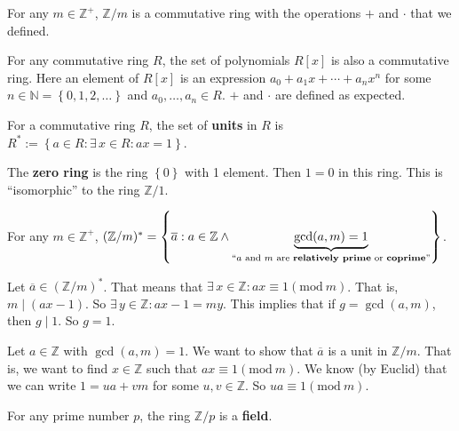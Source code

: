 \documentclass{notes}
\begin{document}
\begin{eg}
  For any $m \in \mathbb Z^+$, $\mathbb Z / m$ is a commutative ring with the operations $+$ and $\cdot$ that we defined.
\end{eg}

\begin{eg}
  For any commutative ring $R$, the set of polynomials $R[x]$ is also a commutative ring.
  Here an element of $R[x]$ is an expression $a_0 + a_1 x + \cdots + a_n x^n$ for some $n \in \mathbb N = \left \{ 0, 1, 2, \dots \right \}$ and $a_0, \dots, a_n \in R$.
  $+$ and $\cdot$ are defined as expected.
\end{eg}

\begin{defn}
  For a commutative ring $R$, the set of {\boldmath \bfseries units} in $R$ is $R^* := \left \{ a \in R : \exists \, x \in R: a x = 1 \right \}$.
\end{defn}

\begin{eg}
  The {\boldmath \bfseries zero ring} is the ring $\left \{ 0 \right \}$ with 1 element.
  Then $1 = 0$ in this ring.
  This is ``isomorphic'' to the ring $\mathbb Z / 1$.
\end{eg}

\newpage

\begin{lem}
  For any $m \in \mathbb Z^+$, $(\mathbb Z / m)^* = \left \{ \overline a : a \in \mathbb Z \wedge \underbrace{\gcd(a, m) = 1}_\text{``$a$ and $m$ are {\boldmath \bfseries relatively prime} or {\boldmath \bfseries coprime}''} \right \}$.
\end{lem}

\begin{prf}
  Let $\overline a \in (\mathbb Z / m)^*$.
  That means that $\exists \, x \in \mathbb Z: a x \equiv 1 (\mathrm{mod}\ m)$.
  That is, $m \mid (a x - 1)$.
  So $\exists \, y \in \mathbb Z: a x - 1 = m y$.
  This implies that if $g = \gcd(a, m)$, then $g \mid 1$.
  So $g = 1$.

  Let $a \in \mathbb Z$ with $\gcd(a, m) = 1$.
  We want to show that $\overline a$ is a unit in $\mathbb Z / m$.
  That is, we want to find $x \in \mathbb Z$ such that $a x \equiv 1 (\mathrm{mod}\ m)$.
  We know (by Euclid) that we can write $1 = u a + v m$ for some $u, v \in \mathbb Z$.
  So $u a \equiv 1 (\mathrm{mod}\ m)$.
\end{prf}

\begin{cor}
  For any prime number $p$, the ring $\mathbb Z / p$ is a {\boldmath \bfseries field}.
\end{cor}
\end{document}
